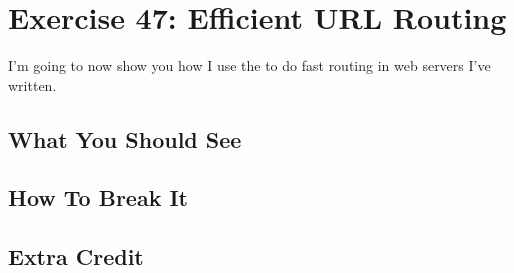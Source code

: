 \chapter{Exercise 47: Efficient URL Routing}

I'm going to now show you how I use the  to do fast 
 routing in web servers I've written.


\section{What You Should See}


\section{How To Break It}


\section{Extra Credit}



